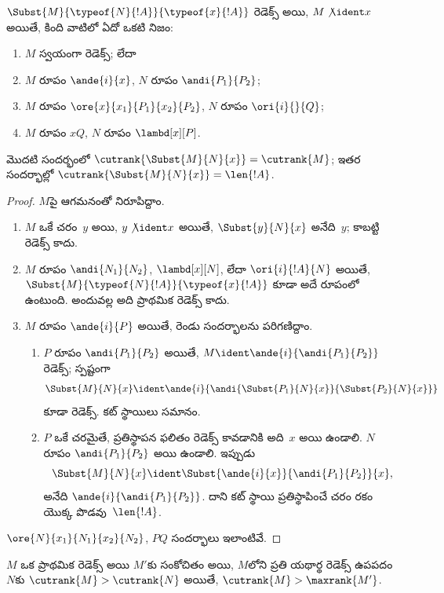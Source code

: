 \documentclass[../../../include/open-logic-section]{subfiles}
\begin{document}
\begin{lem}
  $\Subst{M}{\typeof{N}{!A}}{\typeof{x}{!A}}$ రెడెక్స్ అయి, $M
  \not\ident x$ అయితే, కింది వాటిలో ఏదో ఒకటి నిజం:
  \begin{enumerate}
  \item $M$ స్వయంగా రెడెక్స్; లేదా
  \item $M$ రూపం $\ande{i}{x}$, $N$ రూపం $\andi{P_1}{P_2}$;
  \item $M$ రూపం $\ore{x}{x_1}{P_1}{x_2}{P_2}$, $N$ రూపం $\ori{i}{}{Q}$;
  \item $M$ రూపం $x Q$, $N$ రూపం $\lambd[x][P]$.
  \end{enumerate}
  మొదటి సందర్భంలో $\cutrank{\Subst{M}{N}{x}} = \cutrank{M}$; ఇతర సందర్భాల్లో $\cutrank{\Subst{M}{N}{x}} = \len{!A}$.
\end{lem}
\begin{proof}
  $M$పై ఆగమనంతో నిరూపిద్దాం.
  \begin{enumerate}
  \item $M$ ఒకే చరం~$y$ అయి, $y \not\ident x$ అయితే, $\Subst{y}{N}{x}$ అనేది~$y$; కాబట్టి రెడెక్స్ కాదు.
  \item $M$ రూపం $\andi{N_1}{N_2}$, $\lambd[x][N]$, లేదా $\ori{i}{!A}{N}$ అయితే, $\Subst{M}{\typeof{N}{!A}}{\typeof{x}{!A}}$ కూడా అదే రూపంలో ఉంటుంది. అందువల్ల అది ప్రాథమిక రెడెక్స్ కాదు.
  \item $M$ రూపం $\ande{i}{P}$ అయితే, రెండు సందర్భాలను పరిగణిద్దాం.
    \begin{enumerate}
      \item $P$ రూపం $\andi{P_1}{P_2}$ అయితే, $M \ident
        \ande{i}{\andi{P_1}{P_2}}$ రెడెక్స్; స్పష్టంగా
        \[
        \Subst{M}{N}{x} \ident
        \ande{i}{\andi{\Subst{P_1}{N}{x}}{\Subst{P_2}{N}{x}}}
        \]
        కూడా రెడెక్స్. కట్ స్థాయిలు సమానం.
      \item $P$ ఒకే చరమైతే, ప్రతిస్థాపన ఫలితం రెడెక్స్ కావడానికి అది~$x$ అయి ఉండాలి. $N$ రూపం $\andi{P_1}{P_2}$ అయి ఉండాలి. ఇప్పుడు
        \[
        \Subst{M}{N}{x} \ident \Subst{\ande{i}{x}}{\andi{P_1}{P_2}}{x},
        \]
        అనేది $\ande{i}{\andi{P_1}{P_2}}$. దాని కట్ స్థాయి ప్రతిస్థాపించే చరం రకం యొక్క పొడవు~$\len{!A}$.
    \end{enumerate}
  \end{enumerate}
  $\ore{N}{x_1}{N_1}{x_2}{N_2}$, $P Q$ సందర్భాలు ఇలాంటివే.
\end{proof}

\begin{lem}
  $M$ ఒక ప్రాథమిక రెడెక్స్ అయి $M'$కు సంకోచితం అయి, $M$లోని ప్రతి యథార్థ రెడెక్స్ ఉపపదం~$N$కు $\cutrank{M} > \cutrank{N}$ అయితే, $\cutrank{M} >
  \maxrank{M'}$.
\end{lem}
\end{document}
